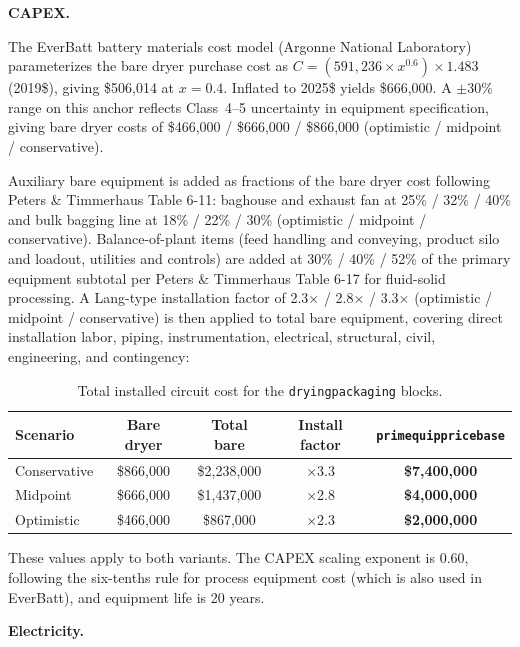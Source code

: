 \documentclass{article}
\renewcommand\_{\textunderscore\allowbreak}
\begin{document}
\vspace{1cm}
\medskip
\noindent\textbf{CAPEX.}\quad

The EverBatt battery materials cost model (Argonne National Laboratory) parameterizes the bare dryer purchase cost as $C = (591,236 \times x^{0.6}) \times 1.483$ (2019\$), giving \$506,014 at $x = 0.4$. Inflated to 2025\$ yields \$666,000. A $\pm$30\% range on this anchor reflects Class~4--5 uncertainty in equipment specification, giving bare dryer costs of \$466,000 / \$666,000 / \$866,000 (optimistic / midpoint / conservative).
 
Auxiliary bare equipment is added as fractions of the bare dryer cost following Peters \& Timmerhaus Table 6-11: baghouse and exhaust fan at 25\% / 32\% / 40\% and bulk bagging line at 18\% / 22\% / 30\% (optimistic / midpoint / conservative). Balance-of-plant items (feed handling and conveying, product silo and loadout, utilities and controls) are added at 30\% / 40\% / 52\% of the primary equipment subtotal per Peters \& Timmerhaus Table 6-17 for fluid-solid processing. A Lang-type installation factor of 2.3$\times$ / 2.8$\times$ / 3.3$\times$ (optimistic / midpoint / conservative) is then applied to total bare equipment, covering direct installation labor, piping, instrumentation, electrical, structural, civil, engineering, and contingency:
 
\begin{table}[h!]
\caption{Total installed circuit cost for the \texttt{drying\_packaging} blocks.}
\centering
\begin{tabular}{lcccc}
\toprule
\textbf{Scenario} & \textbf{Bare dryer} & \textbf{Total bare} & \textbf{Install factor} & \texttt{prim\_equip\_price\_base} \\
\midrule
Conservative & \$866,000 & \$2,238,000 & $\times$3.3 & \textbf{\$7,400,000} \\
Midpoint     & \$666,000 & \$1,437,000 & $\times$2.8 & \textbf{\$4,000,000} \\
Optimistic   & \$466,000 & \$867,000   & $\times$2.3 & \textbf{\$2,000,000} \\
\bottomrule
\end{tabular}
\end{table}

\noindent These values apply to both variants. The CAPEX scaling exponent is 0.60, following the six-tenths rule for process equipment cost (which is also used in EverBatt), and equipment life is 20 years. 

\noindent\textbf{Electricity.}\quad
\end{document}
